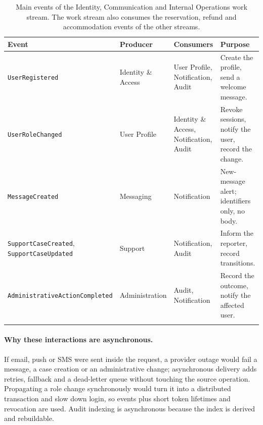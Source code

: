 \begin{longtable}{@{}L{3.7cm}L{2.5cm}L{3.3cm}L{4.3cm}@{}}
\toprule
\textbf{Event} & \textbf{Producer} & \textbf{Consumers} & \textbf{Purpose} \\
\midrule
\endhead
\texttt{User\allowbreak Registered} & Identity \& Access & User Profile, Notification,
  Audit & Create the profile, send a welcome message. \\
\texttt{User\allowbreak Role\allowbreak Changed} & User Profile & Identity \& Access,
  Notification, Audit & Revoke sessions, notify the user, record the
  change. \\
\texttt{Message\allowbreak Created} & Messaging & Notification & New-message alert;
  identifiers only, no body. \\
\texttt{Support\allowbreak Case\allowbreak Created}, \texttt{Support\allowbreak Case\allowbreak Updated} &
  Support & Notification, Audit & Inform the reporter, record transitions. \\
\texttt{Admin\-istrative\allowbreak Action\allowbreak Completed} & Admin\-istration &
  Audit, Notification & Record the outcome, notify the affected user. \\
\bottomrule
\caption{Main events of the Identity, Communication and Internal Operations
work stream. The work stream also consumes the reservation, refund and
accommodation events of the other streams.}
\label{tab:id-events}
\end{longtable}

\paragraph{Why these interactions are asynchronous.} If email, push or SMS
were sent inside the request, a provider outage would fail a message, a case
creation or an administrative change; asynchronous delivery adds retries,
fallback and a dead-letter queue without touching the source operation.
Propagating a role change synchronously would turn it into a distributed
transaction and slow down login, so events plus short token lifetimes and
revocation are used. Audit indexing is asynchronous because the index is
derived and rebuildable.

